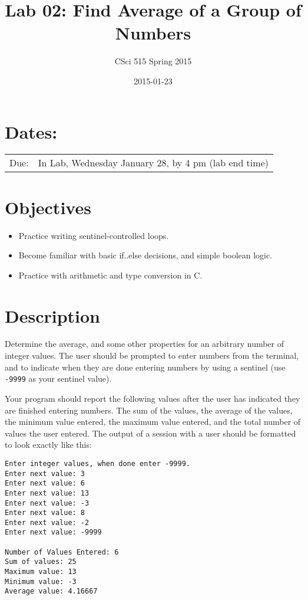 \documentclass[11pt]{article}
\title{Lab 02: Find Average of a Group of Numbers}
\author{CSci 515 Spring 2015}
\date{2015-01-23}
\begin{document}
\maketitle


\section*{Dates:}
\label{sec-1}


\begin{center}
\begin{tabular}{ll}
 Due:  &  In Lab, Wednesday January 28, by 4 pm (lab end time)  \\
\end{tabular}
\end{center}
\section*{Objectives}
\label{sec-2}

\begin{itemize}
\item Practice writing sentinel-controlled loops.
\item Become familiar with basic if..else decisions, and simple boolean logic.
\item Practice with arithmetic and type conversion in C.
\end{itemize}
\section*{Description}
\label{sec-3}

Determine the average, and some other properties for an arbitrary
number of integer values.  The user should be prompted to enter
numbers from the terminal, and to indicate when they are done entering
numbers by using a sentinel (use \verb~-9999~ as your sentinel value).

Your program should report the following values after the user has
indicated they are finished entering numbers.  The sum of the values,
the average of the values, the minimum value entered, the maximum
value entered, and the total number of values the user entered.  The
output of a session with a user should be formatted to look exactly
like this:


\begin{verbatim}
Enter integer values, when done enter -9999.
Enter next value: 3
Enter next value: 6
Enter next value: 13
Enter next value: -3
Enter next value: 8
Enter next value: -2
Enter next value: -9999

Number of Values Entered: 6
Sum of values: 25
Maximum value: 13
Minimum value: -3
Average value: 4.16667
\end{verbatim}
\end{document}
